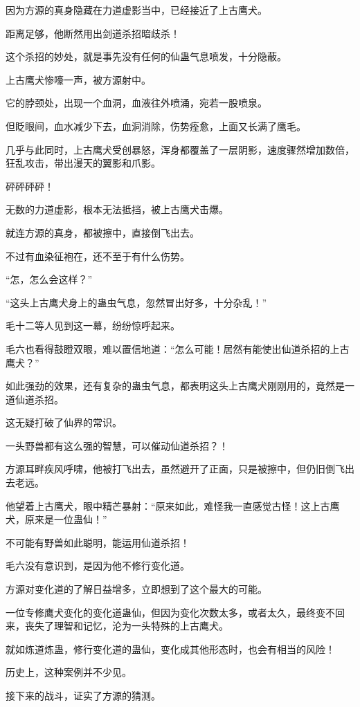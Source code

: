 \begin{this_body}
因为方源的真身隐藏在力道虚影当中，已经接近了上古鹰犬。

距离足够，他断然用出剑道杀招暗歧杀！

这个杀招的妙处，就是事先没有任何的仙蛊气息喷发，十分隐蔽。

上古鹰犬惨嚎一声，被方源射中。

它的脖颈处，出现一个血洞，血液往外喷涌，宛若一股喷泉。

但眨眼间，血水减少下去，血洞消除，伤势痊愈，上面又长满了鹰毛。

几乎与此同时，上古鹰犬受创暴怒，浑身都覆盖了一层阴影，速度骤然增加数倍，狂乱攻击，带出漫天的翼影和爪影。

砰砰砰砰！

无数的力道虚影，根本无法抵挡，被上古鹰犬击爆。

就连方源的真身，都被擦中，直接倒飞出去。

不过有血染征袍在，还不至于有什么伤势。

“怎，怎么会这样？”

“这头上古鹰犬身上的蛊虫气息，忽然冒出好多，十分杂乱！”

毛十二等人见到这一幕，纷纷惊呼起来。

毛六也看得鼓瞪双眼，难以置信地道：“怎么可能！居然有能使出仙道杀招的上古鹰犬？”

如此强劲的效果，还有复杂的蛊虫气息，都表明这头上古鹰犬刚刚用的，竟然是一道仙道杀招。

这无疑打破了仙界的常识。

一头野兽都有这么强的智慧，可以催动仙道杀招？！

方源耳畔疾风呼啸，他被打飞出去，虽然避开了正面，只是被擦中，但仍旧倒飞出去老远。

他望着上古鹰犬，眼中精芒暴射：“原来如此，难怪我一直感觉古怪！这上古鹰犬，原来是一位蛊仙！”

不可能有野兽如此聪明，能运用仙道杀招！

毛六没有意识到，是因为他不修行变化道。

方源对变化道的了解日益增多，立即想到了这个最大的可能。

一位专修鹰犬变化的变化道蛊仙，但因为变化次数太多，或者太久，最终变不回来，丧失了理智和记忆，沦为一头特殊的上古鹰犬。

就如炼道炼蛊，修行变化道的蛊仙，变化成其他形态时，也会有相当的风险！

历史上，这种案例并不少见。

接下来的战斗，证实了方源的猜测。


\end{this_body}
